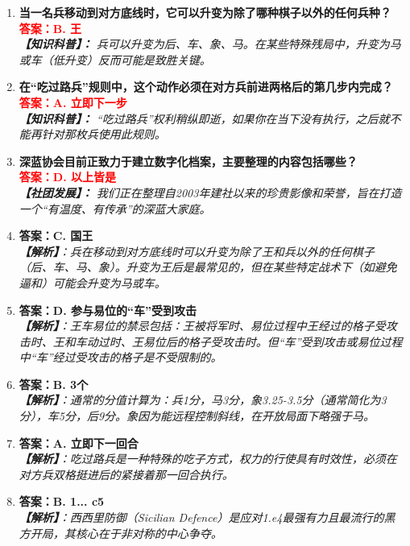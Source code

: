 \documentclass[a4paper, 11pt]{ctexart}
\begin{document}
\begin{enumerate}[label=\arabic*., itemsep=1.5em]
    \item \textbf{当一名兵移动到对方底线时，它可以升变为除了哪种棋子以外的任何兵种？} \\
    \textcolor{red}{\textbf{答案：B. 王}} \\
    \textit{\textbf{【知识科普】：} 兵可以升变为后、车、象、马。在某些特殊残局中，升变为马或车（低升变）反而可能是致胜关键。}

    \item \textbf{在“吃过路兵”规则中，这个动作必须在对方兵前进两格后的第几步内完成？} \\
    \textcolor{red}{\textbf{答案：A. 立即下一步}} \\
    \textit{\textbf{【知识科普】：} “吃过路兵”权利稍纵即逝，如果你在当下没有执行，之后就不能再针对那枚兵使用此规则。}

    \item \textbf{深蓝协会目前正致力于建立数字化档案，主要整理的内容包括哪些？} \\
    \textcolor{red}{\textbf{答案：D. 以上皆是}} \\
    \textit{\textbf{【社团发展】：} 我们正在整理自2003年建社以来的珍贵影像和荣誉，旨在打造一个“有温度、有传承”的深蓝大家庭。}
\item \textbf{答案：C. 国王} \\
    \textit{\textbf{【解析】}：兵在移动到对方底线时可以升变为除了王和兵以外的任何棋子（后、车、马、象）。升变为王后是最常见的，但在某些特定战术下（如避免逼和）可能会升变为马或车。}

    \item \textbf{答案：D. 参与易位的“车”受到攻击} \\
    \textit{\textbf{【解析】}：王车易位的禁忌包括：王被将军时、易位过程中王经过的格子受攻击时、王和车动过时、王易位后的格子受攻击时。但“车”受到攻击或易位过程中“车”经过受攻击的格子是不受限制的。}

    \item \textbf{答案：B. 3个} \\
    \textit{\textbf{【解析】}：通常的分值计算为：兵1分，马3分，象3.25-3.5分（通常简化为3分），车5分，后9分。象因为能远程控制斜线，在开放局面下略强于马。}

    \item \textbf{答案：A. 立即下一回合} \\
    \textit{\textbf{【解析】}：吃过路兵是一种特殊的吃子方式，权力的行使具有时效性，必须在对方兵双格挺进后的紧接着那一回合执行。}

    \item \textbf{答案：B. 1... c5} \\
    \textit{\textbf{【解析】}：西西里防御（Sicilian Defence）是应对1.e4最强有力且最流行的黑方开局，其核心在于非对称的中心争夺。}


\end{enumerate}
\end{document}
